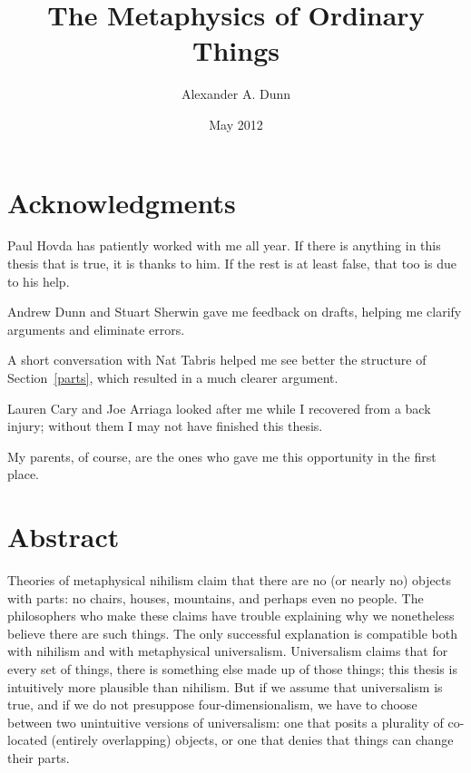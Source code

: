 \documentclass[12pt,twoside]{reedfancy}
\title{The Metaphysics of Ordinary Things}
\author{Alexander A. Dunn}
\date{May 2012}
\begin{document}
  \maketitle
  \frontmatter %
  \pagestyle{empty} %

\begin{spacing}{1.25}

\chapter*{Acknowledgments}
Paul Hovda has patiently worked with me all year.  If there is
anything in this thesis that is true, it is thanks to him.  If the
rest is at least false, that too is due to his help.

Andrew Dunn and Stuart Sherwin gave me feedback on drafts, helping me
clarify arguments and eliminate errors.

A short conversation with Nat Tabris helped me see better the
structure of Section~\ref{parts}, which resulted in a much clearer
argument.

Lauren Cary and Joe Arriaga looked after me while I recovered from a
back injury; without them I may not have finished this thesis.

My parents, of course, are the ones who gave me this opportunity in
the first place.


\tableofcontents


\chapter*{Abstract}
Theories of metaphysical nihilism claim that there are no (or nearly
no) objects with parts: no chairs, houses, mountains, and perhaps even
no people.  The philosophers who make these claims have trouble
explaining why we nonetheless believe there are such things.  The only
successful explanation is compatible both with nihilism and with
metaphysical universalism.  Universalism claims that for every set of
things, there is something else made up of those things; this thesis
is intuitively more plausible than nihilism.  But if we assume that
universalism is true, and if we do not presuppose four-dimensionalism,
we have to choose between two unintuitive versions of universalism:
one that posits a plurality of co-located (entirely overlapping)
objects, or one that denies that things can change their parts.


\end{spacing}
\end{document}
